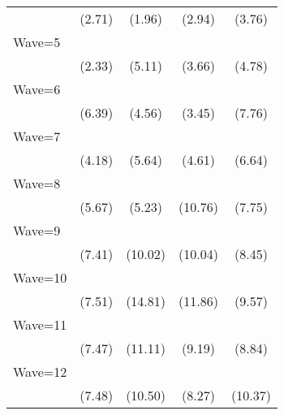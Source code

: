 {\begin{tabular}{l*{4}{c}}
                    &      (2.71)         &      (1.96)         &      (2.94)         &      (3.76)         \\
[1em]
Wave=5              &            \sym{*}  &            \sym{***}&            \sym{***}&            \sym{***}\\
                    &      (2.33)         &      (5.11)         &      (3.66)         &      (4.78)         \\
[1em]
Wave=6              &            \sym{***}&            \sym{***}&            \sym{***}&            \sym{***}\\
                    &      (6.39)         &      (4.56)         &      (3.45)         &      (7.76)         \\
[1em]
Wave=7              &            \sym{***}&            \sym{***}&            \sym{***}&            \sym{***}\\
                    &      (4.18)         &      (5.64)         &      (4.61)         &      (6.64)         \\
[1em]
Wave=8              &            \sym{***}&            \sym{***}&            \sym{***}&            \sym{***}\\
                    &      (5.67)         &      (5.23)         &     (10.76)         &      (7.75)         \\
[1em]
Wave=9              &            \sym{***}&            \sym{***}&            \sym{***}&            \sym{***}\\
                    &      (7.41)         &     (10.02)         &     (10.04)         &      (8.45)         \\
[1em]
Wave=10             &            \sym{***}&            \sym{***}&            \sym{***}&            \sym{***}\\
                    &      (7.51)         &     (14.81)         &     (11.86)         &      (9.57)         \\
[1em]
Wave=11             &            \sym{***}&            \sym{***}&            \sym{***}&            \sym{***}\\
                    &      (7.47)         &     (11.11)         &      (9.19)         &      (8.84)         \\
[1em]
Wave=12             &            \sym{***}&            \sym{***}&            \sym{***}&            \sym{***}\\
                    &      (7.48)         &     (10.50)         &      (8.27)         &     (10.37)         \\

\end{tabular}}
